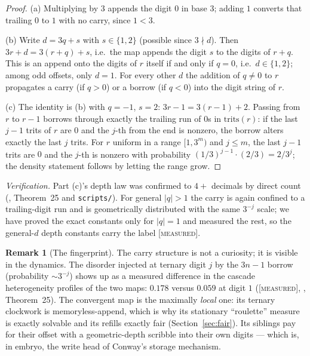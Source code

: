 \documentclass[11pt]{article}
\theoremstyle{definition}
\newtheorem{remark}[theorem]{Remark}
\newcommand{\MEASURED}{\textup{[\textsc{measured}]}}
\begin{document}
\begin{proof}
(a) Multiplying by $3$ appends the digit $0$ in base $3$; adding $1$ converts that
trailing $0$ to $1$ with no carry, since $1 < 3$.

(b) Write $d = 3q + s$ with $s \in \{1, 2\}$ (possible since $3 \nmid d$). Then
$3r + d = 3(r + q) + s$, i.e.\ the map appends the digit $s$ to the digits of $r + q$.
This is an append onto the digits of $r$ itself if and only if $q = 0$, i.e.\
$d \in \{1, 2\}$; among odd offsets, only $d = 1$. For every other $d$ the addition of
$q \neq 0$ to $r$ propagates a carry (if $q > 0$) or a borrow (if $q < 0$) into the
digit string of $r$.

(c) The identity is (b) with $q = -1$, $s = 2$: $3r - 1 = 3(r-1) + 2$. Passing from
$r$ to $r - 1$ borrows through exactly the trailing run of $0$s in
$\mathrm{trits}(r)$: if the last $j - 1$ trits of $r$ are $0$ and the $j$-th from the
end is nonzero, the borrow alters exactly the last $j$ trits. For $r$ uniform in a
range $[1, 3^m)$ and $j \le m$, the last $j-1$ trits are $0$ and the $j$-th is nonzero
with probability $(1/3)^{j-1} \cdot (2/3) = 2/3^j$; the density statement follows by
letting the range grow.
\end{proof}

\emph{Verification.} Part (c)'s depth law was confirmed to $4+$ decimals by direct
count (\cite{Note2026}, Theorem~25 and \texttt{scripts/}). For general $|q| > 1$ the
carry is again confined to a trailing-digit run and is geometrically distributed with
the same $3^{-j}$ scale; we have proved the exact constants only for $|q| = 1$ and
measured the rest, so the general-$d$ depth constants carry the label \MEASURED.

\begin{remark}[The fingerprint]
The carry structure is not a curiosity; it is visible in the dynamics. The disorder
injected at ternary digit $j$ by the $3n-1$ borrow (probability $\sim 3^{-j}$) shows up
as a measured difference in the cascade heterogeneity profiles of the two maps:
$0.178$ versus $0.059$ at digit $1$ (\MEASURED, \cite{Note2026}, Theorem~25). The
convergent map is the maximally \emph{local} one: its ternary clockwork is
memoryless-append, which is why its stationary ``roulette'' measure is exactly solvable
and its refills exactly fair (Section~\ref{sec:fair}). Its siblings pay for their
offset with a geometric-depth scribble into their own digits --- which is, in embryo,
the write head of Conway's storage mechanism.
\end{remark}
\end{document}
